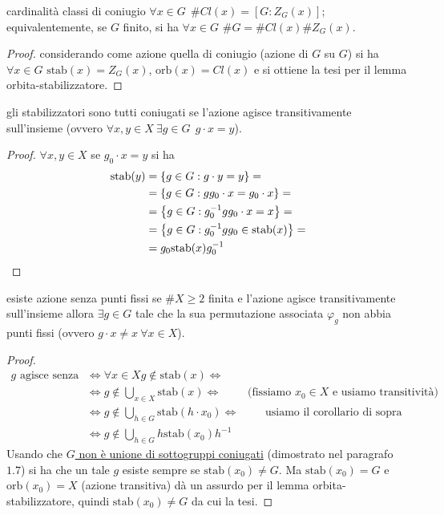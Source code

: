 \begin{example2}{cardinalità classi di coniugio}
    $\forall x \in G \ \ \#Cl(x) = [G : Z_G(x)]$; equivalentemente, se $G$ finito, si ha $\forall x \in G$ $\#G = \#Cl(x) \#Z_G(x)$.
\end{example2}
\begin{proof}
    considerando come azione quella di coniugio (azione di $G$ su $G$) si ha $\forall x \in G$ $\text{stab}(x) = Z_G(x)$, $\text{orb}(x) = Cl(x)$ e si ottiene la tesi per il lemma orbita-stabilizzatore.   
\end{proof}
\begin{corollary}{gli stabilizzatori sono tutti coniugati}
    se l'azione agisce transitivamente sull'insieme (ovvero $\forall x,y \in X \ \exists g \in G \ \ g \cdot x = y$).
\end{corollary}
\begin{proof} $\forall x,y \in X $ se $g_0 \cdot x = y$ si ha 
    \begin{align*}
        \text{stab}(y) & = \left\{ g \in G : g \cdot y = y \right\} = \\
         & = \left\{ g \in G : gg_0 \cdot x = g_0 \cdot x \right\} = \\
         & = \left\{ g \in G : g_0^{-1}gg_0 \cdot x = x \right\} = \\
         & = \left\{ g \in G : g_0^{-1}gg_0 \in \text{stab}(x) \right\} = \\
         & = g_0\text{stab}(x)g_0^{-1}
    \end{align*} 
\end{proof}
\begin{example2}{esiste azione senza punti fissi}
    se $\#X \geq 2$ finita e l'azione agisce transitivamente sull'insieme allora $\exists g \in G$ tale che la sua permutazione associata $\varphi_g$ non abbia punti fissi (ovvero $g\cdot x \neq x \ \forall x \in X$).
\end{example2}
\begin{proof}
    \begin{align*}
        g \text{ agisce senza punti fissi } & \iff \forall x \in X g \not \in \text{stab}(x) \iff \\
        & \iff g \not \in \bigcup_{x \in X} \text{stab}(x) \iff  \qquad \text{ (fissiamo $x_0 \in X$ e usiamo transitività)} \\
        & \iff g \not \in \bigcup_{h \in G} \text{stab}(h \cdot x_0) \iff \qquad \text{ usiamo il corollario di sopra} \\
        & \iff g \not \in \bigcup_{h \in G} h\text{stab}(x_0) h^{-1} 
    \end{align*}
    Usando che \hyperlink{es1}{$G$ non è unione di sottogruppi coniugati} (dimostrato nel paragrafo $1.7$) si ha che un tale $g$ esiste sempre se $\text{stab}(x_0) \neq G$. Ma $\text{stab}(x_0) = G$ e $\text{orb}(x_0) = X$ (azione transitiva) dà un assurdo per il lemma orbita-stabilizzatore, quindi $\text{stab}(x_0) \neq G$ da cui la tesi. 
\end{proof}
